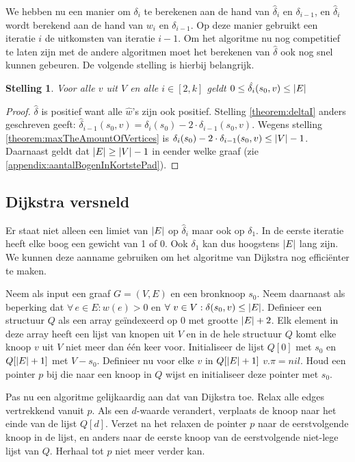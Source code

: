 \documentclass[conference]{IEEEtran}
\newtheorem{theorem}{Stelling}[section]
\theoremstyle{definition}
\theoremstyle{remark}
\DeclarePairedDelimiter{\card}{\vert}{\vert}  %
\let \oldforall \forall
\renewcommand{\forall}{\oldforall\,}
\begin{document}
We hebben nu een manier om $\delta_i$ te berekenen aan de hand van $\hat{\delta}_i$ en $\delta_{i-1}$, en $\hat{\delta}_i$ wordt berekend aan de hand van $w_i$ en $\delta_{i-1}$. Op deze manier gebruikt een iteratie $i$ de uitkomsten van iteratie $i-1$. Om het algoritme nu nog competitief te laten zijn met de andere algoritmen moet het berekenen van $\hat\delta$ ook nog snel kunnen gebeuren. De volgende stelling is hierbij belangrijk.

\begin{theorem}
    Voor alle $v$ uit $V$ en alle $i \in [2, k]$ geldt $0 \leq \hat{\delta_i}(s_0, v) \leq \card{E}$
\end{theorem}
\begin{proof}
    $\hat{\delta}$ is positief want alle $\hat{w}$'s zijn ook positief. Stelling \ref{theorem:deltaI} anders geschreven geeft: $\hat{\delta}_{i-1}(s_0, v) = \delta_i(s_0) - 2 \cdot \delta_{i-1}(s_0, v)$. Wegens stelling \ref{theorem:maxTheAmountOfVertices} is $\delta_i(s_0) - 2 \cdot \delta_{i-1}(s_0, v) \leq \card{V} -1$. Daarnaast geldt dat $\card{E} \geq \card{V} - 1$ in eender welke graaf (zie \ref{appendix:aantalBogenInKortstePad}).
\end{proof}

\subsection{Dijkstra versneld}
Er staat niet alleen een limiet van $\card{E}$ op $\hat{\delta}_i$ maar ook op $\delta_1$. In de eerste iteratie heeft elke boog een gewicht van 1 of 0. Ook $\delta_1$ kan dus hoogstens $\card{E}$ lang zijn. We kunnen deze aanname gebruiken om het algoritme van Dijkstra nog efficiënter te maken.

Neem als input een graaf $G = (V, E)$ en een bronknoop $s_0$. Neem daarnaast als beperking dat $\forall e \in E: w(e) > 0$ en $\forall v \in V: \delta(s_0, v) \leq \card{E}$. Definieer een structuur $Q$ als een array geïndexeerd op 0 met grootte $\card{E} + 2$. Elk element in deze array heeft een lijst van knopen uit $V$ en in de hele structuur $Q$ komt elke knoop $v$ uit $V$ niet meer dan één keer voor. Initialiseer de lijst $Q[0]$ met $s_0$ en $Q[\card{E} + 1]$ met $V - s_0$. Definieer nu voor elke $v$ in $Q[\card{E} + 1]$ $v.\pi = nil$. Houd een pointer $p$ bij die naar een knoop in $Q$ wijst en initialiseer deze pointer met $s_0$.

Pas nu een algoritme gelijkaardig aan dat van Dijkstra toe. Relax alle edges vertrekkend vanuit $p$. Als een $d$-waarde verandert, verplaats de knoop naar het einde van de lijst $Q[d]$. Verzet na het relaxen de pointer $p$ naar de eerstvolgende knoop in de lijst, en anders naar de eerste knoop van de eerstvolgende niet-lege lijst van $Q$. Herhaal tot $p$ niet meer verder kan.
\end{document}
